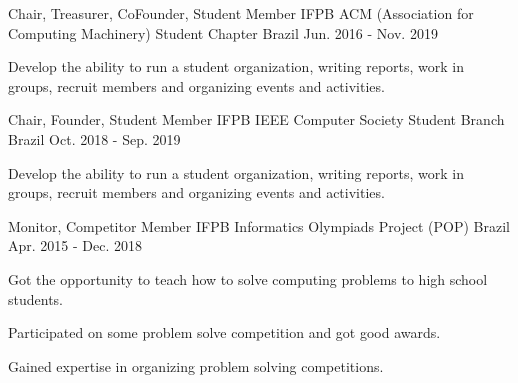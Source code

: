 

\begin{cventries}

  \cventry
    {Chair, Treasurer, CoFounder, Student Member} %
    {IFPB ACM (Association for Computing Machinery) Student Chapter} %
    {Brazil} %
    {Jun. 2016 - Nov. 2019} %
    {
      \begin{cvitems} %
        \item {Develop the ability to run a student organization, writing reports, work in groups, recruit members and organizing events and activities.}      \end{cvitems}
    }
        
  \cventry
    {Chair, Founder, Student Member} %
    {IFPB IEEE Computer Society Student Branch} %
    {Brazil} %
    {Oct. 2018 - Sep. 2019} %
    {
      \begin{cvitems} %
       \item {Develop the ability to run a student organization, writing reports, work in groups, recruit members and organizing events and activities.}
      \end{cvitems}
    }

  \cventry
    {Monitor, Competitor Member} %
    {IFPB Informatics Olympiads Project (POP)} %
    {Brazil} %
    {Apr. 2015 - Dec. 2018} %
    {
      \begin{cvitems} %
        \item {Got the opportunity to teach how to solve computing problems to high school students.}
        \item {Participated on some problem solve competition and got good awards.}
        \item {Gained expertise in organizing problem solving competitions.}
      \end{cvitems}
    }


\end{cventries}
